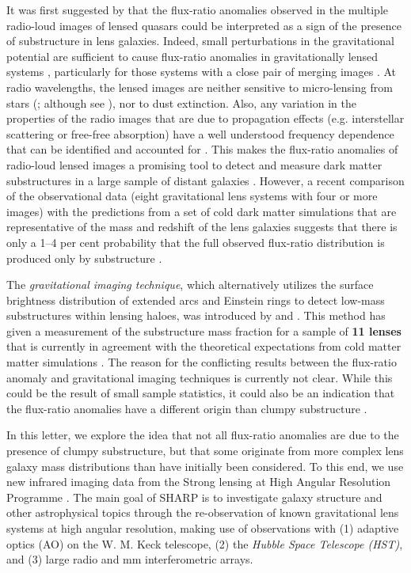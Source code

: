 \documentclass[a4paper,fleqn,usenatbib,useAMS]{mnras}
\begin{document}
It was first suggested by \citet{Mao1998} that the flux-ratio anomalies observed in the multiple radio-loud images of lensed quasars could be interpreted as a sign of the presence of substructure in lens galaxies. Indeed, small perturbations in the gravitational potential are sufficient to cause flux-ratio anomalies in gravitationally lensed systems \citep{metcalf01,Dalal2002,Bradac02}, particularly for those systems with a close pair of merging images \citep{KD04}. At radio wavelengths, the lensed images are neither sensitive to micro-lensing from stars (\citealt{K03}; although see \citealt{koopmans00}), nor to dust extinction. Also, any variation in the properties of the radio images that are due to propagation effects (e.g. interstellar scattering or free-free absorption) have a well understood frequency dependence that can be identified and accounted for \citep[e.g.][]{biggs03,M07,winn04}. This makes the flux-ratio anomalies of radio-loud lensed images a promising tool to detect and measure dark matter substructures in a large sample of distant galaxies \citep{Dalal2002}. However, a recent comparison of the observational data (eight gravitational lens systems with four or more images) with the predictions from a set of cold dark matter simulations that are representative of the mass and redshift of the lens galaxies suggests that there is only a 1--4 per cent probability that the full observed flux-ratio distribution is produced only by substructure \citep{Xu15}.

The \emph{gravitational imaging technique}, which alternatively utilizes the surface brightness distribution of extended arcs and Einstein rings to detect low-mass substructures within lensing haloes, was introduced by \citet{K05} and \citet{V09}. This method has given a measurement of the substructure mass fraction for a sample of {\bf 11 lenses} that is currently in agreement with the theoretical expectations from cold matter matter simulations \citep{V14a,V12}. The reason for the conflicting results between the flux-ratio anomaly and gravitational imaging techniques is currently not clear.  While this could be the result of small sample statistics, it could also be an indication that the flux-ratio anomalies have a different origin than clumpy substructure \citep[see][for a discussion]{Xu15}.

 
In this letter, we explore the idea that not all flux-ratio anomalies are due to the presence of clumpy substructure, but that some originate from more complex lens galaxy mass distributions than have initially been considered. To this end, we use new infrared imaging data from the Strong lensing at High Angular Resolution Programme \citep[SHARP;][]{mckean07,lagattuta10,SHARP12, V12}. The main goal of SHARP is to investigate galaxy structure and other astrophysical topics through the re-observation of known gravitational lens systems at high angular resolution, making use of observations with (1) adaptive optics (AO) on the W. M. Keck telescope, (2) the {\it Hubble Space Telescope (HST)}, and (3) large radio and mm interferometric arrays. 
\end{document}
